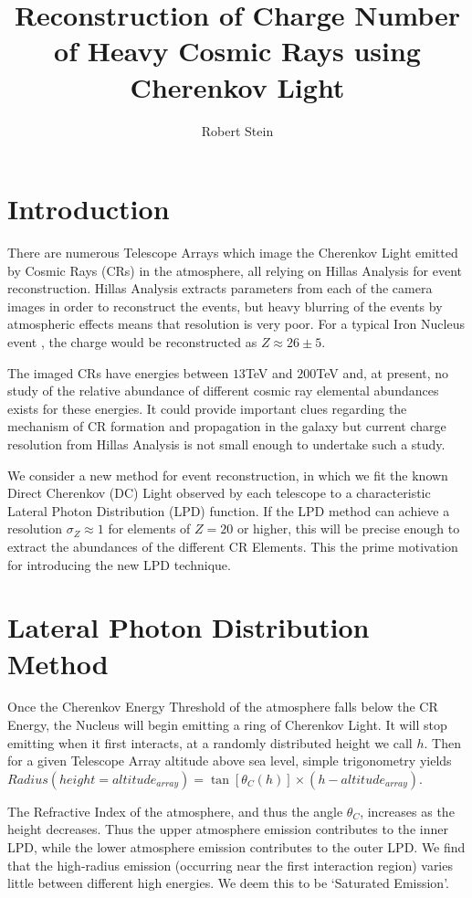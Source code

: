 \documentclass{article}
\begin{document}
\title{Reconstruction of Charge Number of Heavy Cosmic Rays using Cherenkov Light}
\author{Robert Stein}
\maketitle
\section{Introduction}
There are numerous Telescope Arrays which image the Cherenkov Light emitted by Cosmic Rays (CRs) in the atmosphere, all relying on Hillas Analysis for event reconstruction. Hillas Analysis extracts parameters from each of the camera images in order to reconstruct the events, but heavy blurring of the events by atmospheric effects means that resolution is very poor. For a typical Iron Nucleus event \cite{hess07}, the charge would be reconstructed as $Z \approx 26 \pm 5 $.

The imaged CRs have energies between $13 $TeV and $200 $TeV and, at present, no study of the relative abundance of different cosmic ray elemental abundances exists for these energies. It could provide important clues regarding the mechanism of CR formation and propagation in the galaxy but current charge resolution from Hillas Analysis is not small enough to undertake such a study.

We consider a new method for event reconstruction, in which we fit the known Direct Cherenkov (DC) Light observed by each telescope to a characteristic Lateral Photon Distribution (LPD) function. If the LPD method can achieve a resolution $ \sigma_{Z} \approx 1 $ for elements of $Z = 20$ or higher, this will be precise enough to extract the abundances of the different CR Elements. This the prime motivation for introducing the new LPD technique.

\section{Lateral Photon Distribution Method}
Once the Cherenkov Energy Threshold of the atmosphere falls below the CR Energy, the Nucleus will begin emitting a ring of Cherenkov Light. It will stop emitting when it first interacts, at a randomly distributed height we call $h$. Then for a given Telescope Array altitude above sea level, simple trigonometry yields $ Radius(height = altitude_{array}) = \tan [\theta_{C}(h)] \times (h - altitude_{array})$. 

The Refractive Index of the atmosphere, and thus the angle $\theta_{C}$, increases as the height decreases. Thus the upper atmosphere emission contributes to the inner LPD, while the lower atmosphere emission contributes to the outer LPD. We find that the high-radius emission (occurring near the first interaction region) varies little between different high energies. We deem this to be \textquoteleft Saturated Emission\textquoteright.
\end{document}
